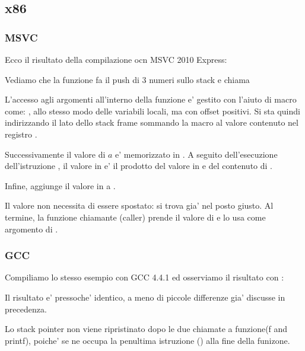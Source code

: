 \subsection{x86}

\subsubsection{MSVC}

Ecco il risultato della compilazione ocn MSVC 2010 Express:




Vediamo che la funzione \main fa il push di 3 numeri sullo stack e chiama  

L'accesso agli argomenti all'interno della funzione \ttf e' gestito con l'aiuto di macro come: , 
allo stesso modo delle variabili locali, ma con offset positivi.
Si sta quindi indirizzando il lato  dello \gls{stack frame} sommando la macro  al valore contenuto nel registro \EBP.


Successivamente il valore di $a$ e' memorizzato in \EAX. A seguito dell'esecuzione dell'istruzione \IMUL, il valore in \EAX e' 
il \gls{prodotto} del valore in \EAX e del contenuto di .

Infine, \ADD aggiunge il valore in  a \EAX.

Il valore \EAX non necessita di essere spostato: si trova gia' nel posto giusto.
Al termine, la funzione chiamante (\gls{caller}) prende il valore di \EAX e lo usa come argomento di \printf.



\subsubsection{GCC}

Compiliamo lo stesso esempio con GCC 4.4.1 ed osserviamo il risultato con \IDA:



Il risultato e' pressoche' identico, a meno di piccole differenze gia' discusse in precedenza.

Lo \gls{stack pointer} non viene ripristinato dopo le due chiamate a funzione(f and printf), 
poiche' se ne occupa la penultima istruzione  () alla fine della funizone.
